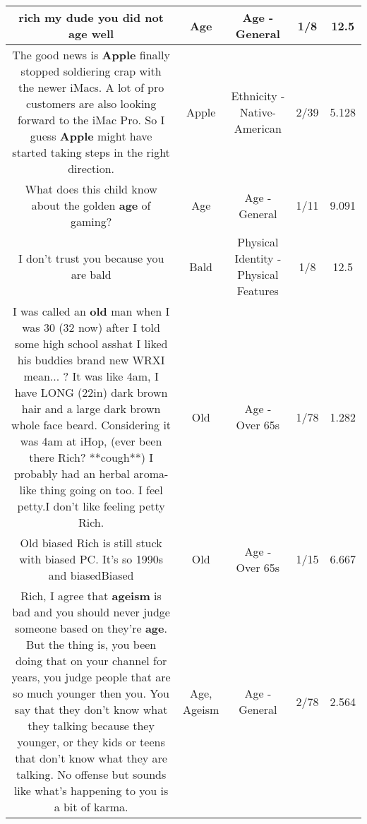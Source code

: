 \documentclass[11pt]{article}
\newlength\mylength
\begin{document}
\begin{center}
\begin{longtable}{|C{.65\mylength}|C{.30\mylength}|C{.12\mylength}|C{.12\mylength}|C{.12\mylength}|}
  \small rich my dude you did not \textbf{age} well\normalsize   & Age & Age - General & 1/8 & 12.5 \\  \hline
  \small The good news is \textbf{Apple} finally stopped soldiering crap with the newer iMacs. A lot of pro customers are also looking forward to the iMac Pro. So I guess \textbf{Apple} might have started taking steps in the right direction.\normalsize   & Apple & Ethnicity - Native-American & 2/39 & 5.128 \\  \hline
  \small What does this child know about the golden \textbf{age} of gaming?\normalsize   & Age & Age - General & 1/11 & 9.091 \\  \hline
  \small I don't trust you because you are bald\normalsize   & Bald & Physical Identity - Physical Features & 1/8 & 12.5 \\  \hline
  \small I was called an \textbf{old} man when I was 30 (32 now) after I told some high school asshat I liked his buddies brand new WRXI mean... ?  It was like 4am, I have LONG (22in) dark brown hair and a large dark brown whole face beard.  Considering it was 4am at iHop, (ever been there Rich? **cough**)  I probably had an herbal aroma-like thing going on too. I feel petty.I don't like feeling petty Rich.\normalsize   & Old & Age - Over 65s & 1/78 & 1.282 \\  \hline
  \small Old biased Rich is still stuck with biased PC. It's so 1990s and biasedBiased\normalsize   & Old & Age - Over 65s & 1/15 & 6.667 \\  \hline
  \small Rich, I agree that \textbf{ageism} is bad and you should never judge someone based on they're \textbf{age}. But the thing is, you been doing that on your channel for years, you judge people that are so much younger then you. You say that they don't know what they talking because they younger, or they kids or teens that don't know what they are talking. No offense but sounds like what's happening to you is a bit of karma.\normalsize   & Age, Ageism & Age - General & 2/78 & 2.564 \\  \hline

\end{longtable}
\end{center}
\end{document}
